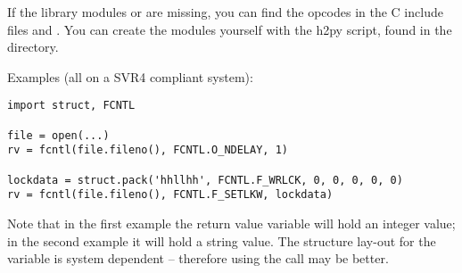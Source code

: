 If the library modules  or  are missing, you
can find the opcodes in the C include files  and
. You can create the modules yourself with the h2py
script, found in the  directory.

Examples (all on a SVR4 compliant system):

\bcode\begin{verbatim}
import struct, FCNTL

file = open(...)
rv = fcntl(file.fileno(), FCNTL.O_NDELAY, 1)

lockdata = struct.pack('hhllhh', FCNTL.F_WRLCK, 0, 0, 0, 0, 0)
rv = fcntl(file.fileno(), FCNTL.F_SETLKW, lockdata)
\end{verbatim}\ecode
%
Note that in the first example the return value variable  will
hold an integer value; in the second example it will hold a string
value.  The structure lay-out for the  variable is
system dependent -- therefore using the  call may be
better.
